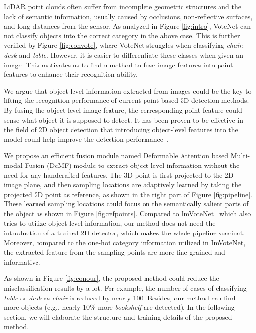 \documentclass[runningheads]{llncs}
\begin{document}
LiDAR point clouds often suffer from incomplete geometric structures and the lack of semantic information, usually caused by occlusions, non-reflective surfaces, and long distances from the sensor.
As analyzed in Figure \ref{fig:intro}, VoteNet can not classify objects into the correct category in the above case.
This is further verified by Figure \ref{fig:convote}, where VoteNet struggles when classifying \textit{chair},  \textit{desk} and \textit{table}. However, it is easier to differentiate these classes when given an image. This motivates us to find a method to fuse image features into point features to enhance their recognition ability.

We argue that object-level information extracted from images could be the key to lifting the recognition performance of current point-based 3D detection methods. By fusing the object-level image feature, the corresponding point feature could sense what object it is supposed to detect. It has been proven to be effective in the field of 2D object detection that introducing object-level features into the model could help improve the detection performance~\cite{hu2018relation,dai17deform,zhu19deformv2}.

We propose an efficient fusion module named Deformable Attention based Multi-modal Fusion (DeMF) module to extract object-level information without the need for any handcrafted features. The 3D point is first projected to the 2D image plane, and then sampling locations are adaptively learned by taking the projected 2D point as reference, as shown in the right part of Figure \ref{fig:pipeline}. These learned sampling locations could focus on the semantically salient parts of the object as shown in Figure \ref{fig:refpoints}. Compared to ImVoteNet~\cite{qi2020imvotenet} which also tries to utilize object-level information, our method does not need the introduction of a trained 2D detector, which makes the whole pipeline succinct. Moreover, compared to the one-hot category information utilized in ImVoteNet, the extracted feature from the sampling points are more fine-grained and informative.

As shown in Figure \ref{fig:conour}, the proposed method could reduce the misclassification results by a lot. For example, the number of cases of classifying \textit{table} or \textit{desk} as \textit{chair} is reduced by nearly 100. 
Besides, our method can find more objects (e.g., nearly 10\% more \textit{bookshelf} are detected).
In the following section, we will elaborate the structure and training details of the proposed method.
\end{document}
